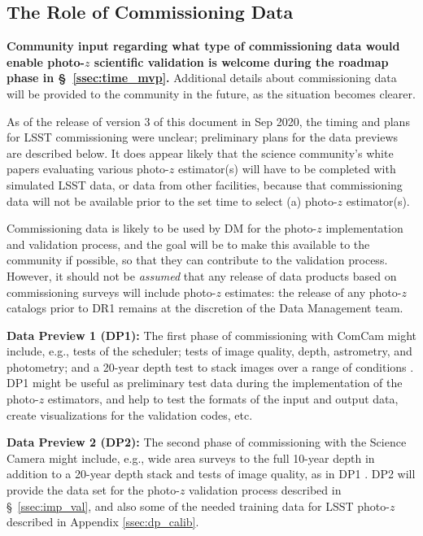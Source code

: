 \documentclass[DM,lsstdraft,toc]{lsstdoc}
\begin{document}
\subsection{The Role of Commissioning Data}\label{ssec:imp_commissioning}

{\bf Community input regarding what type of commissioning data would enable photo-$z$ scientific validation is welcome during the roadmap phase in \S~\ref{ssec:time_mvp}.} Additional details about commissioning data will be provided to the community in the future, as the situation becomes clearer.

As of the release of version 3 of this document in Sep 2020, the timing and plans for LSST commissioning were unclear; preliminary plans for the data previews are described below.
It does appear likely that the science community's white papers evaluating various photo-$z$ estimator(s) will have to be completed with simulated LSST data, or data from other facilities, because that commissioning data will not be available prior to the set time to select (a) photo-$z$ estimator(s).

Commissioning data is likely to be used by DM for the photo-$z$ implementation and validation process, and the goal will be to make this available to the community if possible, so that they can contribute to the validation process.
However, it should not be {\it assumed} that any release of data products based on commissioning surveys will include photo-$z$ estimates: the release of any photo-$z$ catalogs prior to DR1 remains at the discretion of the Data Management team.

{\bf Data Preview 1 (DP1):} The first phase of commissioning with ComCam might include, e.g., tests of the scheduler; tests of image quality, depth, astrometry, and photometry; and a 20-year depth test to stack images over a range of conditions .
DP1 might be useful as preliminary test data during the implementation of the photo-$z$ estimators, and help to test the formats of the input and output data, create visualizations for the validation codes, etc.

{\bf Data Preview 2 (DP2):} The second phase of commissioning with the Science Camera might include, e.g., wide area surveys to the full 10-year depth in addition to a 20-year depth stack and tests of image quality, as in DP1 .
DP2 will provide the data set for the photo-$z$ validation process described in \S~\ref{ssec:imp_val}, and also some of the needed training data for LSST photo-$z$ described in Appendix \ref{ssec:dp_calib}.
\end{document}

